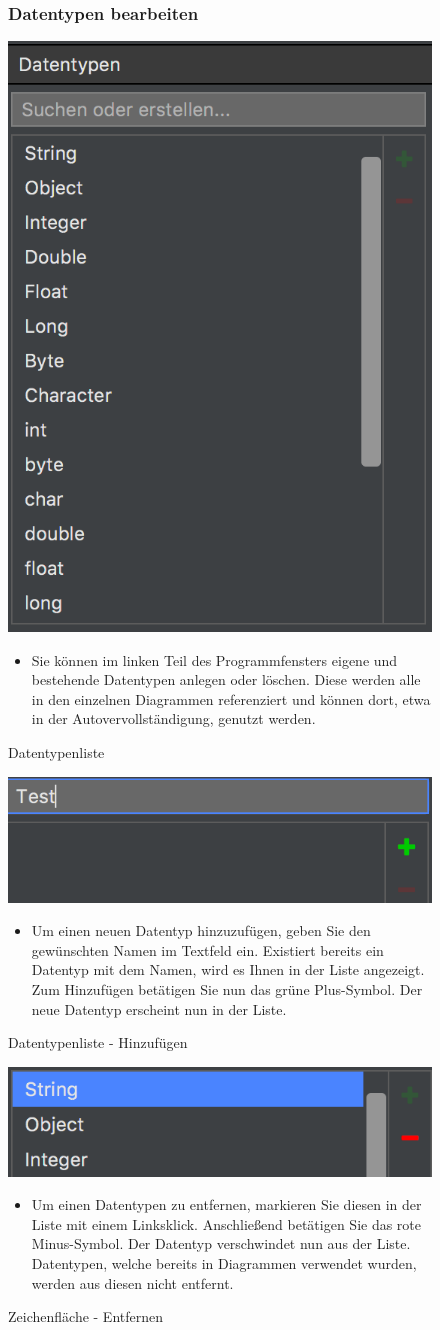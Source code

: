 \begin{figure}[h!]
\subsubsection{Datentypen bearbeiten}
	\centering
	\includegraphics[width=.4\textwidth]{Datentypen.png}
	\caption{Datentypenliste}
\begin{itemize}	
\item Sie können im linken Teil des Programmfensters eigene und bestehende Datentypen anlegen oder löschen. Diese werden alle in den einzelnen Diagrammen referenziert und können dort, etwa in der Autovervollständigung, genutzt werden.
\end{itemize}
\end{figure}

\begin{figure}[h!]
	\centering
	\includegraphics[width=.4\textwidth]{Datentypen_Add.png}
	\caption{Datentypenliste - Hinzufügen}
\begin{itemize}	
\item Um einen neuen Datentyp hinzuzufügen, geben Sie den gewünschten Namen im Textfeld ein. Existiert bereits ein Datentyp mit dem Namen, wird es Ihnen in der Liste angezeigt. Zum Hinzufügen betätigen Sie nun das grüne Plus-Symbol. Der neue Datentyp erscheint nun in der Liste.
\end{itemize}
\end{figure}

\begin{figure}[h!]
	\centering
	\includegraphics[width=.4\textwidth]{Datentypen_Delete.png}
	\caption{Zeichenfläche - Entfernen}
\begin{itemize}	
\item Um einen Datentypen zu entfernen, markieren Sie diesen in der Liste mit einem Linksklick. Anschließend betätigen Sie das rote Minus-Symbol. Der Datentyp verschwindet nun aus der Liste. Datentypen, welche bereits in Diagrammen verwendet wurden, werden aus diesen nicht entfernt.
\end{itemize}
\end{figure}





